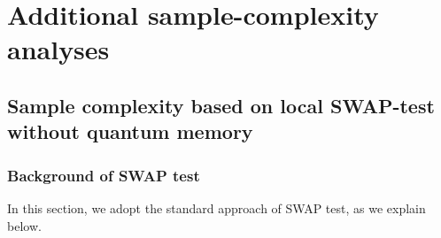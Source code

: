 \documentclass[aps,prx,reprint,superscriptaddress,amsmath,amssymb,longbibliography,floatfix]{revtex4-2}
\providecommand{\bra}[1]{\langle #1|}
\providecommand{\ket}[1]{|#1 \rangle}
\providecommand{\braket}[2]{\langle #1|#2 \rangle}
\newcommand{\scC}{\mathcal{C}}
\theoremstyle{plain}
\newtheorem{theorem}{Theorem}[section]
\theoremstyle{definition}
\theoremstyle{remark}
\begin{document}


\section{Additional sample-complexity analyses}
\label{app:additional analyses}

\subsection{Sample complexity based on local SWAP-test without quantum memory}
\label{app:local swap}

\subsubsection{Background of SWAP test}
\label{app:swap_details}

In this section, we adopt the standard approach of SWAP test, as we explain below.
\end{document}
